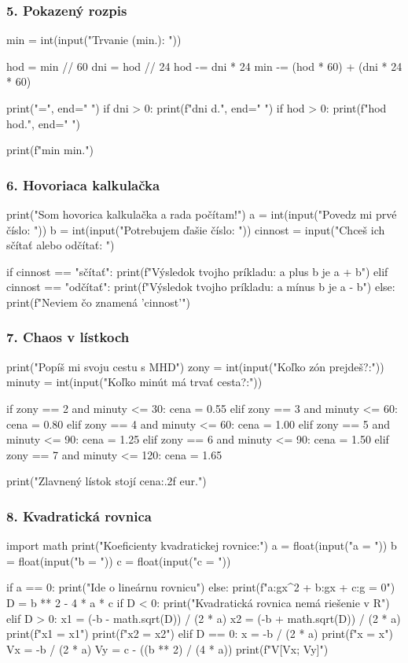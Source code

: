 \subsubsection*{5. Pokazený rozpis}
\begin{solution}
min = int(input("Trvanie (min.): "))

hod = min // 60
dni = hod // 24
hod -= dni * 24
min -= (hod * 60) + (dni * 24 * 60)

print("=", end=" ")
if dni > 0:
    print(f"{dni} d.", end=" ")
if hod > 0:
    print(f"{hod} hod.", end=" ")

print(f"{min} min.")
\end{solution}

\subsubsection*{6. Hovoriaca kalkulačka}
\begin{solution}
print("Som hovorica kalkulačka a rada počítam!")
a = int(input("Povedz mi prvé číslo: "))
b = int(input("Potrebujem ďašie číslo: "))
cinnost = input("Chceš ich sčítať alebo odčítať: ")

if cinnost == "sčítať":
    print(f"Výsledok tvojho príkladu: {a} plus {b} je {a + b}")
elif cinnost == "odčítať":
    print(f"Výsledok tvojho príkladu: {a} mínus {b} je {a - b}")
else:
    print(f"Neviem čo znamená '{cinnost}'")
\end{solution}

\subsubsection*{7. Chaos v lístkoch}
\begin{solution}
print("Popíš mi svoju cestu s MHD")
zony = int(input("Koľko zón prejdeš?:"))
minuty = int(input("Koľko minút má trvať cesta?:"))

if zony == 2 and minuty <= 30:
	cena = 0.55
elif zony == 3 and minuty <= 60:
	cena = 0.80
elif zony == 4 and minuty <= 60:
	cena = 1.00
elif zony == 5 and minuty <= 90:
	cena = 1.25
elif zony == 6 and minuty <= 90:
	cena = 1.50
elif zony == 7 and minuty <= 120:
	cena = 1.65

print("Zlavnený lístok stojí {cena:.2f} eur.")
\end{solution} 

\subsubsection*{8. Kvadratická rovnica}
\begin{solution}
import math
print("Koeficienty kvadratickej rovnice:")
a = float(input("a = "))
b = float(input("b = "))
c = float(input("c = "))

if a == 0:
	print("Ide o lineárnu rovnicu")
else:
	print(f"{a:g}x^2 + {b:g}x + {c:g} = 0")
	D = b ** 2 - 4 * a * c
	if D < 0:
		print("Kvadratická rovnica nemá riešenie v R")
	elif D > 0:
		x1 = (-b - math.sqrt(D)) / (2 * a)
		x2 = (-b + math.sqrt(D)) / (2 * a)
		print(f"x1 = {x1}")
		print(f"x2 = {x2}")
	elif D == 0:
		x = -b / (2 * a)
		print(f"x = {x}")
		Vx = -b / (2 * a)
		Vy = c - ((b ** 2) / (4 * a))
		print(f"V[{Vx}; {Vy}]")
\end{solution}

